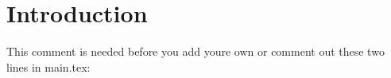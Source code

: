 \section{Introduction}
This comment is needed before you add youre own or comment out these two lines in main.tex:
